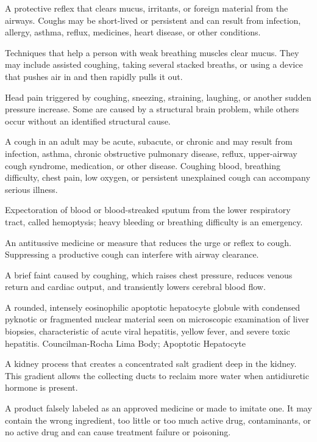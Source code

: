  A protective reflex that clears mucus, irritants, or foreign material from the airways. Coughs may be short-lived or persistent and can result from infection, allergy, asthma, reflux, medicines, heart disease, or other conditions.

 Techniques that help a person with weak breathing muscles clear mucus. They may include assisted coughing, taking several stacked breaths, or using a device that pushes air in and then rapidly pulls it out.

 Head pain triggered by coughing, sneezing, straining, laughing, or another sudden pressure increase. Some are caused by a structural brain problem, while others occur without an identified structural cause.

 A cough in an adult may be acute, subacute, or chronic and may result from infection, asthma, chronic obstructive pulmonary disease, reflux, upper-airway cough syndrome, medication, or other disease. Coughing blood, breathing difficulty, chest pain, low oxygen, or persistent unexplained cough can accompany serious illness.

 Expectoration of blood or blood-streaked sputum from the lower respiratory tract, called hemoptysis; heavy bleeding or breathing difficulty is an emergency.

 An antitussive medicine or measure that reduces the urge or reflex to cough. Suppressing a productive cough can interfere with airway clearance.

 A brief faint caused by coughing, which raises chest pressure, reduces venous return and cardiac output, and transiently lowers cerebral blood flow.

 A rounded, intensely eosinophilic apoptotic hepatocyte globule with condensed pyknotic or fragmented nuclear material seen on microscopic examination of liver biopsies, characteristic of acute viral hepatitis, yellow fever, and severe toxic hepatitis.
\synonyms
Councilman-Rocha Lima Body; Apoptotic Hepatocyte

 A kidney process that creates a concentrated salt gradient deep in the kidney. This gradient allows the collecting ducts to reclaim more water when antidiuretic hormone is present.

 A product falsely labeled as an approved medicine or made to imitate one. It may contain the wrong ingredient, too little or too much active drug, contaminants, or no active drug and can cause treatment failure or poisoning.

